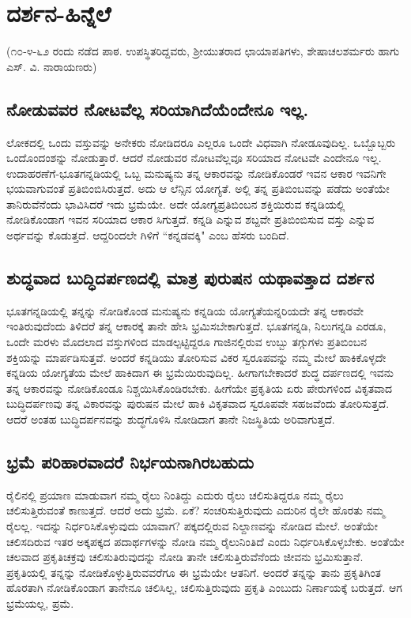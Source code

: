 \chapter{ದರ್ಶನ-ಹಿನ್ನೆಲೆ}

(೧೦-೪-೬೨ ರಂದು ನಡೆದ ಪಾಠ. ಉಪಸ್ಥಿತರಿದ್ದವರು, ಶ್ರೀಯುತರಾದ ಛಾಯಾಪತಿಗಳು, ಶೇಷಾಚಲಶರ್ಮರು ಹಾಗು ಎಸ್. ವಿ. ನಾರಾಯಣರು)

\section*{ನೋಡುವವರ ನೋಟವೆಲ್ಲ ಸರಿಯಾಗಿದೆಯೆಂದೇನೂ ಇಲ್ಲ.}

ಲೋಕದಲ್ಲಿ ಒಂದು ವಸ್ತುವನ್ನು ಅನೇಕರು ನೋಡಿದರೂ ಎಲ್ಲರೂ ಒಂದೇ ವಿಧವಾಗಿ ನೋಡೂವುದಿಲ್ಲ. ಒಬ್ಬೊಬ್ಬರು ಒಂದೊಂದಂಶನ್ನು ನೋಡುತ್ತಾರೆ. ಆದರೆ ನೋಡುವರ ನೋಟವೆಲ್ಲವೂ ಸರಿಯಾದ ನೋಟವೇ ಎಂದೇನೂ ಇಲ್ಲ. ಉದಾಹರಣೆಗೆ-ಭೂತಗನ್ನಡಿಯಲ್ಲಿ ಒಬ್ಬ ಮನುಷ್ಯನು ತನ್ನ ಆಕಾರವನ್ನು ನೋಡಿಕೊಂಡರೆ ಇವನ ಆಕಾರ ಇವನಿಗೇ ಭಯವಾಗುವಂತೆ ಪ್ರತಿಬಿಂಬಿಸಿರುತ್ತದೆ. ಅದು ಆ ಲೆನ್ಸಿನ ಯೋಗ್ಯತೆ. ಅಲ್ಲಿ ತನ್ನ ಪ್ರತಿಬಿಂಬವನ್ನು ಪಡೆದು ಅಂತೆಯೇ ತಾನಿರುವೆನೆಂದು ಭಾವಿಸಿದರೆ ಇದು ಭ್ರಮೆಯೇ. ಅದೇ ಯೋಗ್ಯಪ್ರತಿಬಿಂಬನ ಶಕ್ತಿಯಿರುವ ಕನ್ನಡಿಯಲ್ಲಿ ನೋಡಿಕೊಂಡಾಗ ಇವನ ಸರಿಯಾದ ಆಕಾರ ಸಿಗುತ್ತದೆ. ಕನ್ನಡಿ ಎನ್ನುವ ಶಬ್ದವೇ ಪ್ರತಿಬಿಂಬಿಸುವ ವಸ್ತು ಎನ್ನುವ ಅರ್ಥವನ್ನು ಕೊಡುತ್ತದೆ. ಆದ್ದರಿಂದಲೇ ಗಿಳಿಗೆ ``ಕನ್ನಡವಕ್ಕಿ" ಎಂಬ ಹೆಸರು ಬಂದಿದೆ.

\section*{ಶುದ್ಧವಾದ ಬುದ್ಧಿದರ್ಪಣದಲ್ಲಿ ಮಾತ್ರ ಪುರುಷನ ಯಥಾವತ್ತಾದ ದರ್ಶನ}

ಭೂತಗನ್ನಡಿಯಲ್ಲಿ ತನ್ನನ್ನು ನೋಡಿಕೊಂಡ ಮನುಷ್ಯನು ಕನ್ನಡಿಯ ಯೋಗ್ಯತೆಯನ್ನರಿಯದೇ ತನ್ನ ಆಕಾರವೇ ಇಂತಿರುವುದೆಂದು ತಿಳಿದರೆ ತನ್ನ ಆಕಾರಕ್ಕೆ ತಾನೇ ಹೇಸಿ ಭ್ರಮಿಸಬೇಕಾಗುತ್ತದೆ. ಭೂತಗನ್ನಡಿ, ನಿಲುಗನ್ನಡಿ ಎರಡೂ, ಒಂದೇ ಮರಳು ಮೊದಲಾದ ವಸ್ತುಗಳಿಂದ ಮಾಡಲ್ಪಟ್ಟಿದ್ದರೂ ಗಾಜಿನಲ್ಲಿರುವ ಉಬ್ಬು ತಗ್ಗುಗಳು ಪ್ರತಿಬಿಂಬನ ಶಕ್ತಿಯನ್ನು ಮಾರ್ಪಡಿಸುತ್ತವೆ. ಅಂದರೆ ಕನ್ನಡಿಯು ತೋರಿಸುವ ವಿಕರ ಸ್ವರೂಪವನ್ನು ನಮ್ಮ ಮೇಲೆ ಹಾಕಿಕೊಳ್ಳದೇ ಕನ್ನಡಿಯ ಯೋಗ್ಯತೆಯ ಮೇಲೆ ಹಾಕಿದಾಗ ಈ ಭ್ರಮೆಯಿರುವುದಿಲ್ಲ. ಹೀಗಾಗಬೇಕಾದರೆ ಶುದ್ಧ ದರ್ಪಣದಲ್ಲಿ ಇವನು ತನ್ನ ಆಕಾರವನ್ನು ನೋಡಿಕೊಂಡೂ ನಿಶ್ಚಯಿಸಿಕೊಂಡಿರಬೇಕು. ಹೀಗೆಯೇ ಪ್ರಕೃತಿಯ ಏರು ಪೇರುಗಳಿಂದ ವಿಕೃತವಾದ ಬುದ್ಧಿದರ್ಪಣವು ತನ್ನ ವಿಕಾರವನ್ನು ಪುರುಷನ ಮೇಲೆ ಹಾಕಿ ವಿಕೃತವಾದ ಸ್ವರೂಪವೇ ಸಹಜವೆಂದು ತೋರಿಸುತ್ತದೆ. ಆದರೆ ಅಂತಹ ಬುದ್ಧಿದರ್ಪನವನ್ನು ಶುದ್ಧಗೊಳಿಸಿ ನೋಡಿದಾಗ ತಾನೇ ನಿಜಸ್ಥಿತಿಯ ಅರಿವಾಗುತ್ತದೆ.

\section*{ಭ್ರಮೆ ಪರಿಹಾರವಾದರೆ ನಿರ್ಭಯನಾಗಿರಬಹುದು}

ರೈಲಿನಲ್ಲಿ ಪ್ರಯಾಣ ಮಾಡುವಾಗ ನಮ್ಮ ರೈಲು ನಿಂತಿದ್ದು ಎದುರು ರೈಲು ಚಲಿಸುತಿದ್ದರೂ ನಮ್ಮ ರೈಲು ಚಲಿಸುತ್ತಿರುವಂತೆ ಕಾಣುತ್ತದೆ. ಆದರೆ ಅದು ಭ್ರಮೆ. ಏಕೆ? ಸಂಚರಿಸುತ್ತಿರುವುದು ಎದುರಿನ ರೈಲೇ ಹೊರತು ನಮ್ಮ ರೈಲಲ್ಲ. ಇದನ್ನು ನಿರ್ಧರಿಸಿಕೊಳ್ಳುವುದು ಯಾವಾಗ? ಪಕ್ಕದಲ್ಲಿರುವ ನಿಲ್ದಾಣವನ್ನು ನೋಡಿದ ಮೇಲೆ. ಅಂತೆಯೇ ಚಲಿಸದಿರುವ ಇತರ ಅಕ್ಕಪಕ್ಕದ ಪದಾರ್ಥಗಳನ್ನು ನೋಡಿ ನಮ್ಮ ರೈಲುನಿಂತಿದೆ ಎಂದು ನಿರ್ಧರಿಸಿಕೊಳ್ಳಬೇಕು. ಅಂತೆಯೇ ಚಲವಾದ ಪ್ರಕೃತಿಚಕ್ರವು ಚಲಿಸುತಿರುವುದನ್ನು ನೋಡಿ ತಾನೇ ಚಲಿಸುತ್ತಿರುವೆನೆಂದು ಜೀವನು ಭ್ರಮಿಸುತ್ತಾನೆ. ಪ್ರಕೃತಿಯಲ್ಲಿ ತನ್ನನ್ನು ನೋಡಿಕೊಳ್ಳುತ್ತಿರುವವರೆಗೂ ಈ ಭ್ರಮೆಯೇ ಆತನಿಗೆ. ಅಂದರೆ ತನ್ನನ್ನು ತಾನು ಪ್ರಕೃತಿಗಿಂತ ಹೊರತಾಗಿ ನೋಡಿಕೊಂಡಾಗ ತಾನೇನೂ ಚಲಿಸಿಲ್ಲ, ಚಲಿಸುತ್ತಿರುವುದು ಪ್ರಕೃತಿ ಎಂಬುದು ನಿರ್ಣಾಯಕ್ಕೆ ಬರುತ್ತದೆ. ಆಗ ಭ್ರಮೆಯಲ್ಲ, ಪ್ರಮೆ.

